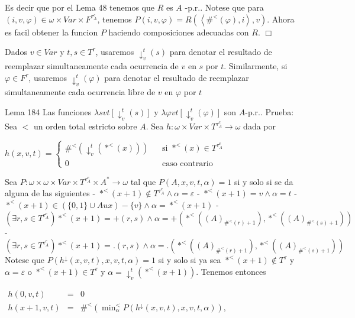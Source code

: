 Es decir que por el Lema 48 tenemos que \(R\) es \(A\) -p.r.. Notese que para \((i,v,\varphi )\in \omega \times Var\times F^{\tau _{A}^{e}}\), tenemos \(P(i,v,\varphi )=R(\left\langle \#^{< }(\varphi ),i\right\rangle ,v)\). Ahora es facil obtener la funcion \(P\) haciendo composiciones adecuadas con \(R\). \(\Box\)

Dados \(v\in Var\) y \(t,s\in T^{\tau }\), usaremos \(\downarrow _{v}^{t}(s)\) para denotar el resultado de reemplazar simultaneamente cada ocurrencia de \( v \) en \(s\) por \(t\). Similarmente, si \(\varphi \in F^{\tau }\), usaremos \( \downarrow _{v}^{t}(\varphi )\) para denotar el resultado de reemplazar simultaneamente cada ocurrencia libre de \(v\) en \(\varphi \) por \(t\)

Lema 184 Las funciones \(\lambda svt[\downarrow _{v}^{t}(s)]\) y \(\lambda \varphi vt[\downarrow _{v}^{t}(\varphi )]\) son \(A\)-p.r..
Prueba: Sea \(< \) un orden total estricto sobre \(A\). Sea \(h:\omega \times Var\times T^{\tau _{A}^{e}}\rightarrow \omega \) dada por

\(\displaystyle h(x,v,t)=\left\{ \begin{array}{ccc} \#^{< }(\downarrow _{v}^{t}(\ast ^{< }(x))) & & \text{si }\ast ^{< }(x)\in T^{\tau _{A}^{e}} \\ 0 & & \text{caso contrario} \end{array} \right. \)

Sea \(P:\omega \times \omega \times Var\times T^{\tau _{A}^{e}}\times A^{\ast }\rightarrow \omega \) tal que \(P(A,x,v,t,\alpha )=1\) si y solo si se da alguna de las siguientes
- \(\ast ^{< }(x+1)\notin T^{\tau _{A}^{e}}\wedge \alpha =\varepsilon \)
- \(\ast ^{< }(x+1)=v\wedge \alpha =t\)
- \(\ast ^{< }(x+1)\in (\{0,1\}\cup Aux)-\{v\}\wedge \alpha =\ast ^{< }(x+1)\)
- \((\exists r,s\in T^{\tau _{A}^{e}})\ast ^{< }(x+1)=+(r,s)\wedge \alpha =+(\ast ^{< }((A)_{\#^{< }(r)+1}),\ast ^{< }((A)_{\#^{< }(s)+1}))\)
- \((\exists r,s\in T^{\tau _{A}^{e}})\ast ^{< }(x+1)=\mathrm{.} (r,s)\wedge \alpha =\mathrm{.}(\ast ^{< }((A)_{\#^{< }(r)+1}),\ast ^{< }((A)_{\#^{< }(s)+1}))\)
Notese que \(P(h^{\downarrow }(x,v,t),x,v,t,\alpha )=1\) si y solo si ya sea \(\ast ^{< }(x+1)\notin T^{\tau }\) y \(\alpha =\varepsilon \) o \(\ast ^{< }(x+1)\in T^{\tau }\) y \(\alpha =\mathrm{\downarrow }_{v}^{t}(\ast ^{< }(x+1))\). Tenemos entonces

\(\displaystyle \begin{array}{rcl} h(0,v,t) & =& 0 \\ h(x+1,v,t) & =& \#^{< }(\min_{\alpha }^{< }P(h^{\downarrow }(x,v,t),x,v,t,\alpha )), \end{array} \)

